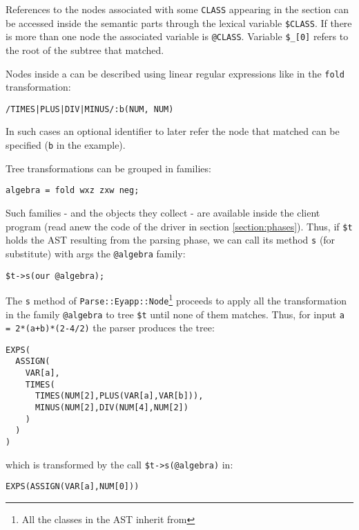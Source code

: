 References to the nodes associated with some
\verb|CLASS| appearing in the 
section can be accessed inside the semantic parts
through the lexical variable \verb|$CLASS|.
If there is more than one node the 
associated variable is \verb|@CLASS|. Variable \verb|$_[0]|
refers to the root of the subtree that matched.

Nodes inside a  can be described using linear
regular expressions like in the \verb|fold| transformation:
\begin{verbatim}
/TIMES|PLUS|DIV|MINUS/:b(NUM, NUM)
\end{verbatim}
In such cases an optional identifier 
to later refer the node that matched 
can be specified (\verb|b| in the example).

Tree transformations can be grouped in families:

\begin{verbatim}
algebra = fold wxz zxw neg;
\end{verbatim}

Such families - and the objects they collect - are 
available inside the client program (read anew the code
of the driver in section \ref{section:phases}). Thus,
if \verb|$t| holds the AST resulting
from the parsing phase, we can call
its method \verb|s| (for substitute)
with args the \verb|@algebra| family:
\begin{verbatim}
$t->s(our @algebra);
\end{verbatim}

The \verb|s| method of 
\verb|Parse::Eyapp::Node|\footnote{All the classes in the AST
inherit from }
proceeds to apply all the transformation in the family
\verb|@algebra| to tree \verb|$t|
until none of them matches. Thus, for input
\verb|a = 2*(a+b)*(2-4/2)| the parser
produces the tree:
\begin{verbatim}
EXPS(
  ASSIGN(
    VAR[a],
    TIMES(
      TIMES(NUM[2],PLUS(VAR[a],VAR[b])),
      MINUS(NUM[2],DIV(NUM[4],NUM[2])
    )
  )
)
\end{verbatim}
which is transformed by the call 
\verb|$t->s(@algebra)| in:
\begin{verbatim}
EXPS(ASSIGN(VAR[a],NUM[0]))
\end{verbatim}




